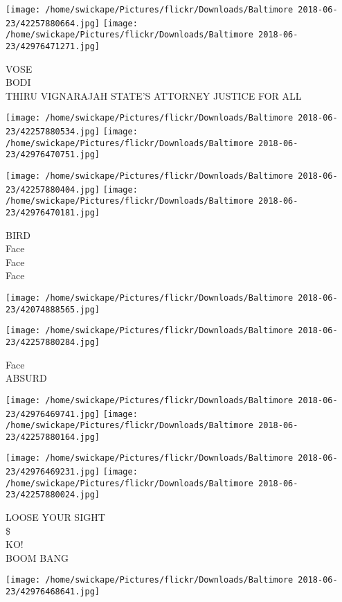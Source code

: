 \documentclass[10pt,letterpaper]{article}
\begin{document}
\vspace{0.25in}
\texttt{[image: /home/swickape/Pictures/flickr/Downloads/Baltimore 2018-06-23/42257880664.jpg]}
\texttt{[image: /home/swickape/Pictures/flickr/Downloads/Baltimore 2018-06-23/42976471271.jpg]}

VOSE\\
BODI\\
THIRU VIGNARAJAH STATE'S ATTORNEY JUSTICE FOR ALL
\pagebreak

\texttt{[image: /home/swickape/Pictures/flickr/Downloads/Baltimore 2018-06-23/42257880534.jpg]}
\texttt{[image: /home/swickape/Pictures/flickr/Downloads/Baltimore 2018-06-23/42976470751.jpg]}

\texttt{[image: /home/swickape/Pictures/flickr/Downloads/Baltimore 2018-06-23/42257880404.jpg]}
\texttt{[image: /home/swickape/Pictures/flickr/Downloads/Baltimore 2018-06-23/42976470181.jpg]}

BIRD\\
Face\\
Face\\
Face
\pagebreak

\texttt{[image: /home/swickape/Pictures/flickr/Downloads/Baltimore 2018-06-23/42074888565.jpg]}

\vspace{0.25in}
\texttt{[image: /home/swickape/Pictures/flickr/Downloads/Baltimore 2018-06-23/42257880284.jpg]}

Face\\
ABSURD
\pagebreak

\texttt{[image: /home/swickape/Pictures/flickr/Downloads/Baltimore 2018-06-23/42976469741.jpg]}
\texttt{[image: /home/swickape/Pictures/flickr/Downloads/Baltimore 2018-06-23/42257880164.jpg]}

\texttt{[image: /home/swickape/Pictures/flickr/Downloads/Baltimore 2018-06-23/42976469231.jpg]}
\texttt{[image: /home/swickape/Pictures/flickr/Downloads/Baltimore 2018-06-23/42257880024.jpg]}

LOOSE YOUR SIGHT\\
\$\\
KO!\\
BOOM BANG
\pagebreak

\texttt{[image: /home/swickape/Pictures/flickr/Downloads/Baltimore 2018-06-23/42976468641.jpg]}
\end{document}
